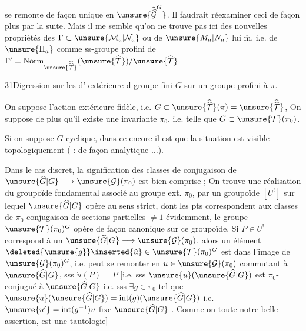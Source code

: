 se remonte de façon unique en
$\unsure{\widehat{\widehat{\mathcal G}}^{G}}$.
Il faudrait réexaminer ceci de façon plus  par la suite.
Mais il me semble qu'on ne trouve pas ici des nouvelles propriétés des
$\Gamma\subset\unsure{\mathcal M_a|\mathcal N_a}$ ou de
$\unsure{M_a|N_a}$ lui $\overline{\mathrm m}$, i.e. de
$\unsure{\Pi_a}$ comme ss-groupe profini de
$\Gamma'=\operatorname{Norm}_{\unsure{\widehat{\widehat{\mathcal T}}}}
(\unsure{\widehat{\mathcal T}})/\unsure{\widehat{\mathcal T}}$

\uline{31}\quad Digression sur les 
d'  extérieure
d groupe fini $G$ sur un
groupe profini à  $\pi$.

On suppose l'action extérieure \uline{fidèle},
i.e. $G\subset\unsure{\widehat{\widehat{\mathcal T}}}(\pi)
=\unsure{\widehat{\widehat{\mathcal T}}}$,
On suppose de plus qu'il existe une 
invariante $\pi_0$, i.e. telle que
$G\subset\unsure{\mathcal T}(\pi_0)$.

Si on suppose $G$ cyclique, dans ce 
encore il est  que la situation est
\uline{visible} topologiquement ( :
\uline{} de façon analytique  $\ldots$).

Dans le cas discret, la signification des classes de
conjugaison de 
$\unsure{\widehat G|G}\longrightarrow\unsure{\mathcal G}(\pi_0)$ est bien comprise ;
On trouve une  réalisation
 du groupoïde fondamental
associé au
groupe ext. $\pi_0$, par un groupoïde  $[U^{!}]$
sur lequel $\unsure{\widehat G|G}$ opère au sens strict, dont les pts
correspondent aux classes de $\pi_0$-conjugaison de sections
partielles $\ne1$ évidemment, le groupe
$\unsure{\mathcal T}(\pi_0)^G$
opère de façon  canonique sur ce groupoïde.
Si $P\in U^{!}$ correspond à un 
$\unsure{\widehat G|G}\longrightarrow\unsure{\mathcal G}(\pi_0)$, alors
un élément $\deleted{\unsure{g}}\inserted{\dot u}\in
\unsure{\mathcal T}(\pi_0)^G$ est dans l'image de
$\unsure{\mathcal G}(\pi_0)^G$, i.e. peut se remonter en
$u\in\unsure{\mathcal G}(\pi_0)$ commutant à $\unsure{\widehat G|G}$, sss
$\dot u(P)=P$ [i.e. sss
$\unsure{u}(\unsure{\widehat G|G})$ est $\pi_0$-conjugué à $\unsure{\widehat G|G}$
i.e. sss $\exists g\in\pi_0$ tel que
$\unsure{u}(\unsure{\widehat G|G})=\operatorname{int}(g)(\unsure{\widehat G|G})$
i.e. 
$\unsure{u'}=\operatorname{int}(g^{-1})u$ fixe $\unsure{\widehat G|G}$
.
 Comme on  
 toute notre belle assertion, est une tautologie]

